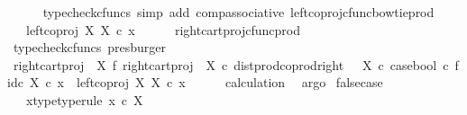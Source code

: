 \begin{isabellebody}
\ \ \ \ \isamarkupfalse%
\ {\isacharparenleft}{\kern0pt}typecheck{\isacharunderscore}{\kern0pt}cfuncs{\isacharcomma}{\kern0pt}\ simp\ add{\isacharcolon}{\kern0pt}\ comp{\isacharunderscore}{\kern0pt}associative{}\ left{\isacharunderscore}{\kern0pt}coproj{\isacharunderscore}{\kern0pt}cfunc{\isacharunderscore}{\kern0pt}bowtie{\isacharunderscore}{\kern0pt}prod{\isacharparenright}{\kern0pt}\isanewline
\ \ \isamarkupfalse%
\ \isamarkupfalse%
\ {\isachardoublequoteopen}{\isachardot}{\kern0pt}{\isachardot}{\kern0pt}{\isachardot}{\kern0pt}\ {\isacharequal}{\kern0pt}\ left{\isacharunderscore}{\kern0pt}coproj\ X\ X\ {\isasymcirc}\isactrlsub c\ x{\isachardoublequoteclose}\isanewline
\ \ \ \ \isamarkupfalse%
\ right{\isacharunderscore}{\kern0pt}cart{\isacharunderscore}{\kern0pt}proj{\isacharunderscore}{\kern0pt}cfunc{\isacharunderscore}{\kern0pt}prod\ \isamarkupfalse%
\ {\isacharparenleft}{\kern0pt}typecheck{\isacharunderscore}{\kern0pt}cfuncs{\isacharcomma}{\kern0pt}\ presburger{\isacharparenright}{\kern0pt}\isanewline
\ \ \isamarkupfalse%
\ \isamarkupfalse%
\ {\isachardoublequoteopen}{\isacharparenleft}{\kern0pt}{\isacharparenleft}{\kern0pt}right{\isacharunderscore}{\kern0pt}cart{\isacharunderscore}{\kern0pt}proj\ {\isasymone}\ X\ {\isasymbowtie}\isactrlsub f\ right{\isacharunderscore}{\kern0pt}cart{\isacharunderscore}{\kern0pt}proj\ {\isasymone}\ X{\isacharparenright}{\kern0pt}\ {\isasymcirc}\isactrlsub c\ dist{\isacharunderscore}{\kern0pt}prod{\isacharunderscore}{\kern0pt}coprod{\isacharunderscore}{\kern0pt}right\ {\isasymone}\ {\isasymone}\ X\ {\isasymcirc}\isactrlsub c\ {\isasymlangle}case{\isacharunderscore}{\kern0pt}bool\ {\isasymcirc}\isactrlsub c\ f{\isacharcomma}{\kern0pt}id\isactrlsub c\ X{\isasymrangle}{\isacharparenright}{\kern0pt}\ {\isasymcirc}\isactrlsub c\ x\ {\isacharequal}{\kern0pt}\ left{\isacharunderscore}{\kern0pt}coproj\ X\ X\ {\isasymcirc}\isactrlsub c\ x{\isachardoublequoteclose}\isanewline
\ \ \ \ \isamarkupfalse%
\ calculation\ \isamarkupfalse%
\ argo\isanewline
{}\isamarkupfalse%
%
\endisatagproof
{\isafoldproof}%
%
\isadelimproof
\isanewline
%
\endisadelimproof
\isanewline
{}\isamarkupfalse%
\ false{\isacharunderscore}{\kern0pt}case{\isacharcolon}{\kern0pt}\isanewline
\ \ \ x{\isacharunderscore}{\kern0pt}type{\isacharbrackleft}{\kern0pt}type{\isacharunderscore}{\kern0pt}rule{\isacharbrackright}{\kern0pt}{\isacharcolon}{\kern0pt}\ {\isachardoublequoteopen}x\ {\isasymin}\isactrlsub c\ X{\isachardoublequoteclose}\isanewline

\end{isabellebody}

